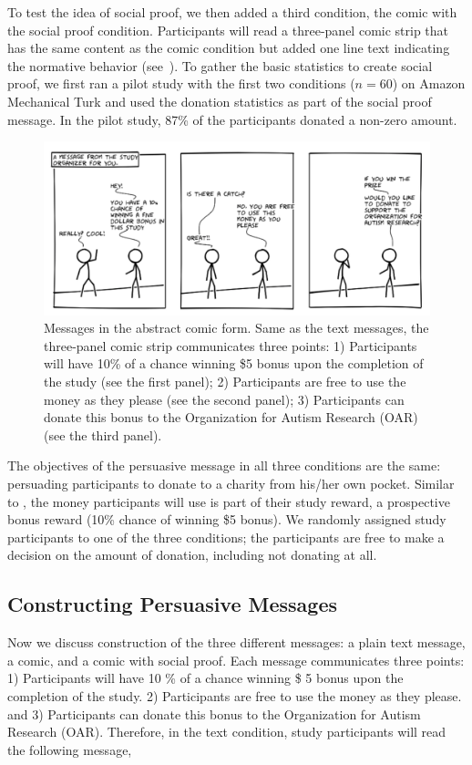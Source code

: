 To test the idea of social proof, we then added a third condition, the comic with the social proof condition. Participants will read a three-panel comic strip that has the same content as the comic condition but added one line text indicating the normative behavior (see~). To gather the basic statistics to create social proof, we first ran a pilot study with the first two conditions ($n=60$) on Amazon Mechanical Turk and used the donation statistics as part of the social proof message. In the pilot study, 87\% of the participants donated a non-zero amount. 

\begin{figure}[bt]
    \centering
    \includegraphics[width=\columnwidth]{./figures/abstract_comic.png}
    \caption{Messages in the abstract comic form. Same as the text messages, the three-panel comic strip communicates three points: 1) Participants will have 10\% of a chance winning \$5 bonus upon the completion of the study (see the first panel); 2) Participants are free to use the money as they please (see the second panel); 3) Participants can donate this bonus to the Organization for Autism Research (OAR) (see the third panel).}
    \label{fig:basic three comic panel}
\end{figure}

The objectives of the persuasive message in all three conditions are the same: persuading participants to donate to a charity from his/her own pocket. Similar to \textcite{lee2013does,saunders2016no}, the money participants will use is part of their study reward, a prospective bonus reward (10\% chance of winning \$5 bonus). We randomly assigned study participants to one of the three conditions; the participants are free to make a decision on the amount of donation, including not donating at all.

\subsection{Constructing Persuasive Messages}
\label{sub:Constructing Persuasive Messages}
Now we discuss construction of the three different messages: a plain text message, a comic, and a comic with social proof. Each message communicates three points: 1) Participants will have 10 \% of a chance winning \$ 5 bonus upon the completion of the study. 2) Participants are free to use the money as they please. and 3) Participants can donate this bonus to the Organization for Autism Research (OAR). Therefore, in the text condition, study participants will read the following message,

